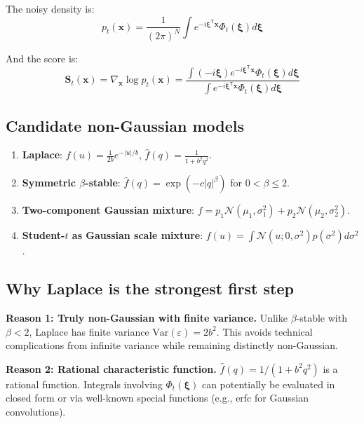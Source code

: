 \documentclass[11pt,a4paper]{article}
\theoremstyle{plain}
\theoremstyle{definition}
\newcommand{\vct}[1]{\mathbf{#1}}
\newcommand{\tr}{\mathsf{T}}
\begin{document}
The noisy density is:
\begin{equation}
p_t(\vct{x}) = \frac{1}{(2\pi)^N}\int e^{-i\boldsymbol{\xi}^\tr\vct{x}}\Phi_t(\boldsymbol{\xi}) d\boldsymbol{\xi}
\end{equation}

And the score is:
\begin{equation}
\vct{S}_t(\vct{x}) = \nabla_{\vct{x}}\log p_t(\vct{x}) = \frac{\int (-i\boldsymbol{\xi})e^{-i\boldsymbol{\xi}^\tr\vct{x}}\Phi_t(\boldsymbol{\xi})d\boldsymbol{\xi}}{\int e^{-i\boldsymbol{\xi}^\tr\vct{x}}\Phi_t(\boldsymbol{\xi})d\boldsymbol{\xi}}
\end{equation}

\subsection{Candidate non-Gaussian models}
\label{sec:candidates}

\begin{enumerate}
\item \textbf{Laplace}: $f(u) = \frac{1}{2b}e^{-|u|/b}$, $\hat{f}(q) = \frac{1}{1+b^2q^2}$.

\item \textbf{Symmetric $\beta$-stable}: $\hat{f}(q) = \exp(-c|q|^\beta)$ for $0 < \beta \le 2$.

\item \textbf{Two-component Gaussian mixture}: $f = p_1\mathcal{N}(\mu_1, \sigma_1^2) + p_2\mathcal{N}(\mu_2, \sigma_2^2)$.

\item \textbf{Student-$t$ as Gaussian scale mixture}: $f(u) = \int \mathcal{N}(u; 0, \sigma^2)p(\sigma^2)d\sigma^2$.
\end{enumerate}

\subsection{Why Laplace is the strongest first step}
\label{sec:why-laplace}

\textbf{Reason 1: Truly non-Gaussian with finite variance.}
Unlike $\beta$-stable with $\beta < 2$, Laplace has finite variance $\text{Var}(\varepsilon) = 2b^2$. This avoids technical complications from infinite variance while remaining distinctly non-Gaussian.

\textbf{Reason 2: Rational characteristic function.}
$\hat{f}(q) = 1/(1+b^2q^2)$ is a rational function. Integrals involving $\Phi_t(\boldsymbol{\xi})$ can potentially be evaluated in closed form or via well-known special functions (e.g., erfc for Gaussian convolutions).
\end{document}
